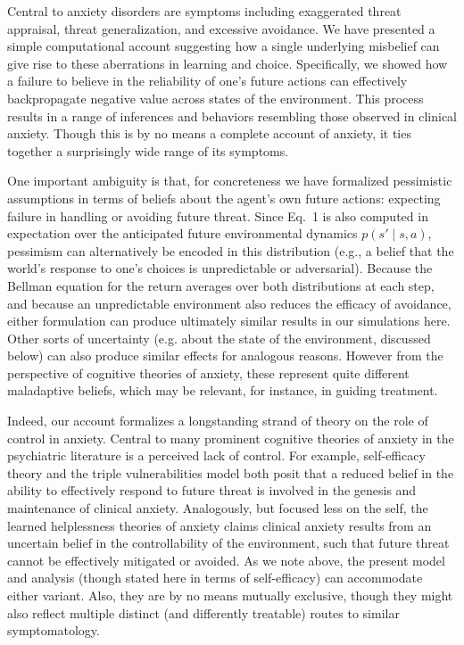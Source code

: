 \documentclass[11pt]{article} %
\begin{document}
Central to anxiety disorders are symptoms including exaggerated threat appraisal, threat generalization, and excessive avoidance. We have presented a simple computational account suggesting how a single underlying misbelief can give rise to these aberrations in learning and choice. Specifically, we showed how a failure to believe in the reliability of one's future actions can effectively backpropagate negative value across states of the environment. This process results in a range of inferences and behaviors resembling those observed in clinical anxiety. Though this is by no means a complete account of anxiety, it ties together a surprisingly wide range of its symptoms.

One important ambiguity is that, for concreteness we have formalized pessimistic assumptions in terms of beliefs about the agent's own future actions: expecting failure in handling or avoiding future threat. Since Eq.~1 is also computed in expectation over the anticipated future environmental dynamics $p(s' \mid s,a)$, pessimism can alternatively be encoded in this distribution (e.g., a belief that the world's response to one's choices is unpredictable or adversarial). Because the Bellman equation for the return averages over both distributions at each step, and because an unpredictable environment also reduces the efficacy of avoidance, either formulation can produce ultimately similar results in our simulations here. Other sorts of uncertainty (e.g. about the state of the environment, discussed below) can also produce similar effects for analogous reasons. However from the perspective of cognitive theories of anxiety, these represent quite different maladaptive beliefs, which may be relevant, for instance, in guiding treatment.

Indeed, our account formalizes a longstanding strand of theory on the role of control in anxiety. Central to many prominent cognitive theories of anxiety in the psychiatric literature is a perceived lack of control. For example, self-efficacy theory \citep{bandura1977} and the triple vulnerabilities model \citep{barlow2002} both posit that a reduced belief in the ability to effectively respond to future threat is involved in the genesis and maintenance of clinical anxiety. Analogously, but focused less on the self, the learned helplessness theories of anxiety \cite{alloy1990} claims clinical anxiety results from an uncertain belief in the controllability of the environment, such that future threat cannot be effectively mitigated or avoided. As we note above, the present model and analysis (though stated here in terms of self-efficacy) can accommodate either variant. Also, they are by no means mutually exclusive, though they might also reflect multiple distinct (and differently treatable) routes to similar symptomatology.
\end{document}
